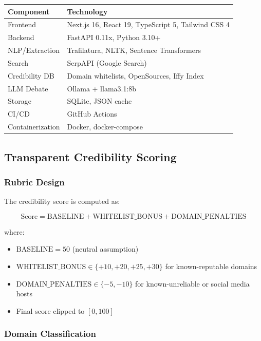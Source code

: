 \documentclass[12pt,a4paper,twoside]{article}
\begin{document}
\begin{table}[H]
    \centering
    \begin{tabular}{|l|l|}
        \hline
        \textbf{Component} & \textbf{Technology} \\
        \hline
        Frontend & Next.js 16, React 19, TypeScript 5, Tailwind CSS 4 \\
        Backend & FastAPI 0.11x, Python 3.10+ \\
        NLP/Extraction & Trafilatura, NLTK, Sentence Transformers \\
        Search & SerpAPI (Google Search) \\
        Credibility DB & Domain whitelists, OpenSources, Iffy Index \\
        LLM Debate & Ollama + llama3.1:8b \\
        Storage & SQLite, JSON cache \\
        CI/CD & GitHub Actions \\
        Containerization & Docker, docker-compose \\
        \hline
    \end{tabular}
\end{table}

\subsection{Transparent Credibility Scoring}

\subsubsection{Rubric Design}

The credibility score is computed as:

\[\text{Score} = \text{BASELINE} + \text{WHITELIST\_BONUS} + \text{DOMAIN\_PENALTIES}\]

where:

\begin{itemize}
    \item $\text{BASELINE} = 50$ (neutral assumption)
    \item $\text{WHITELIST\_BONUS} \in \{+10, +20, +25, +30\}$ for known-reputable domains
    \item $\text{DOMAIN\_PENALTIES} \in \{-5, -10\}$ for known-unreliable or social media hosts
    \item Final score clipped to $[0, 100]$
\end{itemize}

\subsubsection{Domain Classification}
\end{document}
